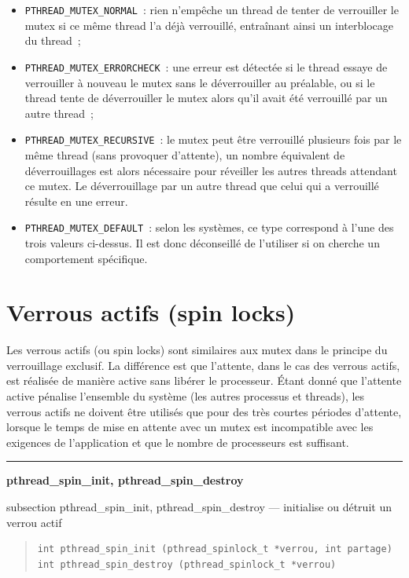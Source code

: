 \documentclass [twoside] {report}
\newcommand {\primitive} [1]
    {
	\phantomsection
	{\large \textbf {#1}}
	\addcontentsline {toc} {subsection} {#1}
    }
\newcommand {\separation}
    {
	\vspace {5mm}
	\nopagebreak
	\hrule
    }
\begin{document}
\begin {itemize}
    \item \verb|PTHREAD_MUTEX_NORMAL|~: rien n'empêche un thread
	de tenter de verrouiller le mutex si ce même thread l'a déjà
	verrouillé, entraînant ainsi un interblocage du thread~;
    \item \verb|PTHREAD_MUTEX_ERRORCHECK|~: une erreur est détectée
	si le thread essaye de verrouiller à nouveau le mutex sans le
	déverrouiller au préalable, ou si le thread tente de
	déverrouiller le mutex alors qu'il avait été verrouillé par un
	autre thread~;
    \item \verb|PTHREAD_MUTEX_RECURSIVE|~: le mutex peut être verrouillé
	plusieurs fois par le même thread (sans provoquer d'attente),
	un nombre équivalent de déverrouillages est alors nécessaire
	pour réveiller les autres threads attendant ce mutex. Le
	déverrouillage par un autre thread que celui qui a verrouillé
	résulte en une erreur.
    \item \verb|PTHREAD_MUTEX_DEFAULT|~: selon les systèmes, ce type
	correspond à l'une des trois valeurs ci-dessus. Il est donc
	déconseillé de l'utiliser si on cherche un comportement
	spécifique.
\end {itemize}


\section {Verrous actifs (spin locks)}

Les verrous actifs (ou spin locks) sont similaires aux mutex dans le
principe du verrouillage exclusif. La différence est que l'attente,
dans le cas des verrous actifs, est réalisée de manière active sans
libérer le processeur. Étant donné que l'attente active pénalise
l'ensemble du système (les autres processus et threads), les verrous
actifs ne doivent être utilisés que pour des très courtes périodes
d'attente, lorsque le temps de mise en attente avec un mutex est
incompatible avec les exigences de l'application et que le nombre de
processeurs est suffisant.

\separation
\primitive {pthread\_spin\_init, pthread\_spin\_destroy} --- initialise ou détruit un verrou actif

\begin {quote}
\begin {verbatim}
int pthread_spin_init (pthread_spinlock_t *verrou, int partage)
int pthread_spin_destroy (pthread_spinlock_t *verrou)
\end{verbatim}
\end {quote}
\end{document}
